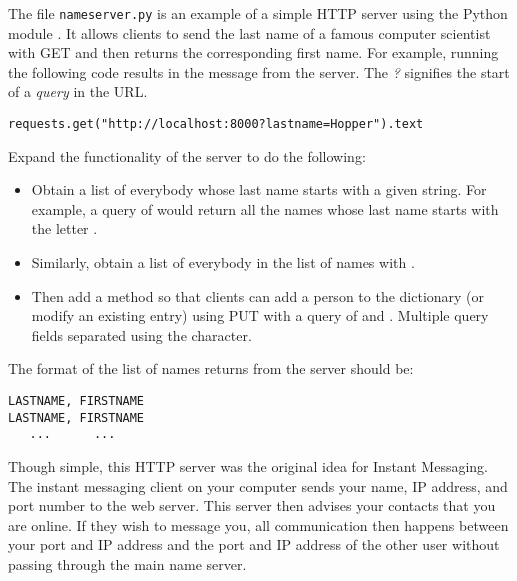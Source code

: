 \begin{problem}
The file \texttt{nameserver.py} is an example of a simple HTTP server using the Python module .
It allows clients to send the last name of a famous computer scientist with GET and then returns the corresponding first name.
For example, running the following code results in the message  from the server.
The \emph{?} signifies the start of a \emph{query} in the URL.

\begin{lstlisting}
requests.get("http://localhost:8000?lastname=Hopper").text
\end{lstlisting}

Expand the functionality of the server to do the following:
\begin{itemize}
\item Obtain a list of everybody whose last name starts with a given string. For example, a query of  would return all the names whose last name starts with the letter .
\item Similarly, obtain a list of everybody in the list of names with .
\item Then add a method  so that clients can add a person to the dictionary (or modify an existing entry) using PUT with a query of  and . Multiple query fields separated using the  character.
\end{itemize}
The format of the list of names returns from the server should be:
\begin{lstlisting}
LASTNAME, FIRSTNAME
LASTNAME, FIRSTNAME
   ...      ...
\end{lstlisting}

\end{problem}

Though simple, this HTTP server was the original idea for Instant Messaging.
The instant messaging client on your computer sends your name, IP address, and port number to the web server.
This server then advises your contacts that you are online.
If they wish to message you, all communication then happens between your port and IP address and the port and IP address of the other user without passing through the main name server.

